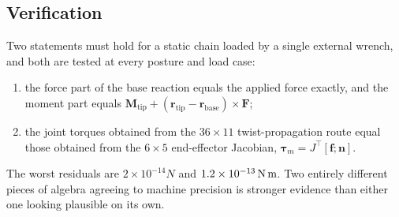 \subsection{Verification}
\label{sec:robotics:verif}

Two statements must hold for a static chain loaded by a single external wrench,
and both are tested at every posture and load case:

\begin{enumerate}[label=(\roman*)]
\item the force part of the base reaction equals the applied force exactly, and
      the moment part equals $\mathbf M_{\text{tip}} + (\mathbf r_{\text{tip}} - \mathbf r_{\text{base}})\times\mathbf F$;
\item the joint torques obtained from the $36\times11$ twist-propagation route
      equal those obtained from the $6\times5$ end-effector Jacobian,
      $\boldsymbol\tau_m = J^\top[\mathbf f; \mathbf n]$.
\end{enumerate}

The worst residuals are $2\times10^{-14}\unit{N}$ and $1.2\times 10^{-13}\,\mathrm{N\,m}$.
Two entirely different pieces of algebra agreeing to machine precision is
stronger evidence than either one looking plausible on its own.
